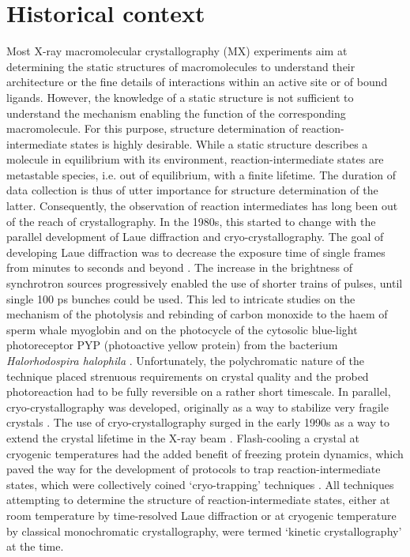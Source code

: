 \section{Historical context}\label{sec:history}

Most X-ray macromolecular crystallography (MX) experiments aim at determining the static structures of macromolecules to understand their architecture or the fine details of interactions within an active site or of bound ligands. However, the knowledge of a static structure is not sufficient to understand the mechanism enabling the function of the corresponding macromolecule. For this purpose, structure determination of reaction-intermediate states is highly desirable. While a static structure describes a molecule in equilibrium with its environment, reaction-intermediate states are metastable species, i.e. out of equilibrium, with a finite lifetime. The duration of data collection is thus of utter importance for structure determination of the latter. Consequently, the observation of reaction intermediates has long been out of the reach of crystallography. In the 1980s, this started to change with the parallel development of Laue diffraction and cryo-crystallography. The goal of developing Laue diffraction was to decrease the exposure time of single frames from minutes to seconds and beyond \parencite{moffatLaueDiffractionTimeresolved2019}. The increase in the brightness of synchrotron sources progressively enabled the use of shorter trains of pulses, until single 100 ps bunches could be used. This led to intricate studies on the mechanism of the photolysis and rebinding of carbon monoxide to the haem of sperm whale myoglobin \parencite{schotteWatchingProteinIt2003} and on the photocycle of the cytosolic blue-light photoreceptor PYP (photoactive yellow protein) from the bacterium \textit{Halorhodospira halophila} \parencite{jungVolumeconservingTransCis2013}. Unfortunately, the polychromatic nature of the technique placed strenuous requirements on crystal quality and the probed photoreaction had to be fully reversible on a rather short timescale. In parallel, cryo-crystallography was developed, originally as a way to stabilize very fragile crystals \parencite{hopeCryocrystallographyRibosomalParticles1989}. The use of cryo-crystallography surged in the early 1990s as a way to extend the crystal lifetime in the X-ray beam \parencite{garmanMacromolecularCryocrystallography1997}. Flash-cooling a crystal at cryogenic temperatures had the added benefit of freezing protein dynamics, which paved the way for the development of protocols to trap reaction-intermediate states, which were collectively coined ‘cryo-trapping’ techniques \parencite{bourgeoisAdvancesKineticProtein2005}. All techniques attempting to determine the structure of reaction-intermediate states, either at room temperature by time-resolved Laue diffraction or at cryogenic temperature by classical monochromatic crystallography, were termed ‘kinetic crystallography’ at the time.

